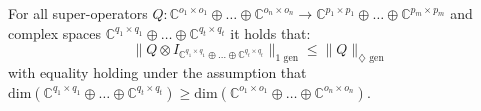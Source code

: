 %
%
%
%
%
%
%
%
%

%
%
%
%
%
%
%
%
%

\begin{theorem} \label{theorem:tensor_stability} 
  For all super-operators $Q: \mathbb{C}^{o_1 \times o_1} \oplus \ldots \oplus \mathbb{C}^{o_n \times o_n}  \rightarrow \mathbb{C}^{p_1 \times p_1} \oplus \ldots \oplus  \mathbb{C}^{p_m \times p_m}$ and complex spaces $\mathbb{C}^{q_1 \times q_1} \oplus \ldots \oplus \mathbb{C}^{q_t \times q_t}$  it holds that:
      \begin{equation}
        \lVert Q \otimes I_{\mathbb{C}^{q_1 \times q_1} \oplus \ldots \oplus \mathbb{C}^{q_t \times q_t}} \rVert_{1 \text{ gen}} \leq  \lVert Q \rVert_{\diamondsuit \text{ gen}}
      \end{equation}
      with equality holding under the assumption that $\text{dim}(\mathbb{C}^{q_1 \times q_1} \oplus \ldots \oplus \mathbb{C}^{q_t \times q_t}) \geq  \text{dim}(\mathbb{C}^{o_1 \times o_1} \oplus \ldots \oplus \mathbb{C}^{o_n \times o_n})$.
      \end{theorem}
  
